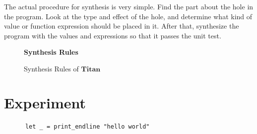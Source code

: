 \documentclass[12pt, a4paper, titlepage]{report}
\begin{document}
    The actual procedure for synthesis is very simple.
    Find the part about the hole in the program.
    Look at the type and effect of the hole, and determine what kind of value or function expression should be placed in it.
    After that, synthesize the program with the values and expressions so that it passes the unit test.
    \begin{figure}[htbp]
      \begin{flushleft}
        \textbf{Synthesis Rules} \quad {}
      \end{flushleft}
      \centering
      \caption{Synthesis Rules of $\mathbf{Titan}$}
      \label{fig:synthesisRules}
    \end{figure}

\chapter{Experiment}\label{chapter:experiment}
    \begin{verbatim}
      let _ = print_endline "hello world"
    \end{verbatim}
\end{document}

